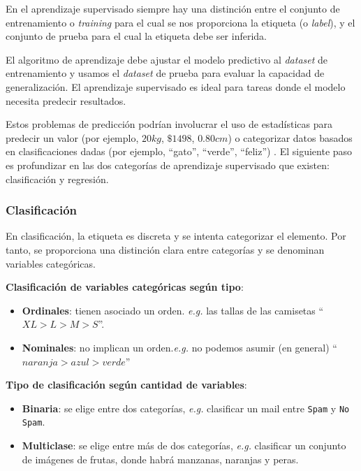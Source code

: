 \documentclass[a4paper,12pt]{article}
\begin{document}
En el aprendizaje supervisado siempre hay una distinción entre el conjunto de entrenamiento o \textit{training} para el cual se nos proporciona la etiqueta (o \textit{label}), y el conjunto de prueba para el cual la etiqueta debe ser inferida. 

El algoritmo de aprendizaje debe ajustar el modelo predictivo al \textit{dataset} de entrenamiento y usamos el \textit{dataset} de prueba para evaluar la capacidad de generalización. El aprendizaje supervisado es ideal para tareas donde el modelo necesita predecir resultados.

Estos problemas de predicción podrían involucrar el uso de estadísticas para predecir un valor (por ejemplo, $20 kg$, $\$1498$, $0.80 cm$) o categorizar datos basados en clasificaciones dadas (por ejemplo, ``gato'', ``verde'', ``feliz'') \cite{norman2019aprendizaje}. El siguiente paso es profundizar en las dos categorías de aprendizaje supervisado que existen: clasificación y regresión.

\subsubsection{Clasificación}

En clasificación, la etiqueta es discreta y se intenta categorizar el elemento. Por tanto, se proporciona una distinción clara entre categorías y se denominan variables categóricas.

\textbf{Clasificación de variables categóricas según tipo}: 
\begin{itemize}[noitemsep, topsep=2pt]
	\item \textbf{Ordinales}: tienen asociado un orden. \textit{e.g.} las tallas de las camisetas ``$XL > L > M > S$''.
	\item \textbf{Nominales}: no implican un orden.\textit{e.g.} no podemos asumir (en general) ``$naranja > azul > verde$''
\end{itemize}

\textbf{Tipo de clasificación según cantidad de variables}:
\begin{itemize}[noitemsep, topsep=2pt]
	\item \textbf{Binaria}: se elige entre dos categorías, \textit{e.g.} clasificar un mail entre \texttt{Spam} y \texttt{No Spam}.
	\item \textbf{Multiclase}: se elige entre más de dos categorías, \textit{e.g.} clasificar un conjunto de imágenes de frutas, donde habrá manzanas, naranjas y peras. 
\end{itemize} 
\end{document}
